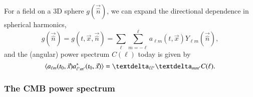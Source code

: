 For a field on a 3D sphere $g(\vec{\hat{n}})$, we can expand the directional dependence in spherical harmonics,
\begin{equation}\label{mil4:theo:eq:spherical_harmonics_expansion}
    g(\vec{\hat{n}}) = g(t, \vec{x}, \vec{\hat{n}})=  \sum_{\ell} \sum_{m=-\ell}^{\ell} a_{\ell m}(t, \vec{x}) Y_{\ell m} (\vec{\hat{n}}),
\end{equation}
and the (angular) power spectrum $C(\ell)$ today is given by
\begin{equation}\label{mil4:theo:eq:defining_angular_power_spectrum}
    \avg{a\ellm(t_0, \vec{x}) a^\ast\ellmp(t_0, \vec{x})}= \kroneckerdelta{\ell \ell'} \kroneckerdelta{m m'} C(\ell).
\end{equation}



\subsubsection{The CMB power spectrum}

